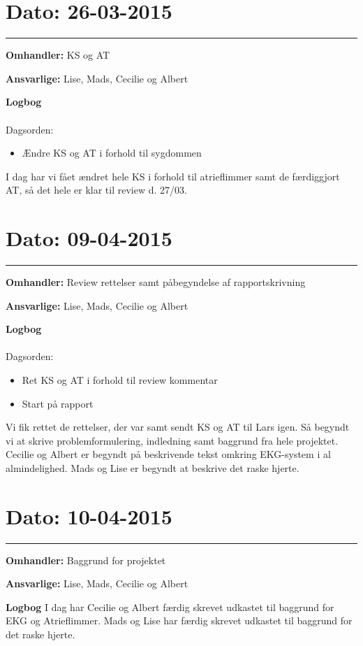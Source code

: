 \section{Dato: 26-03-2015}
\hrule 

\textbf{Omhandler:} KS og AT 

\textbf{Ansvarlige:} Lise, Mads, Cecilie og Albert
 
\textbf{Logbog}
\\
\\
Dagsorden:
\begin{itemize}
	\item Ændre KS og AT i forhold til sygdommen
\end{itemize}

I dag har vi fået ændret hele KS i forhold til atrieflimmer samt de færdiggjort AT, så det hele er klar til review d. 27/03. 



\section{Dato: 09-04-2015}
\hrule 

\textbf{Omhandler:} Review rettelser samt påbegyndelse af rapportskrivning 

\textbf{Ansvarlige:} Lise, Mads, Cecilie og Albert 

\textbf{Logbog}
\\
\\
Dagsorden:
\begin{itemize}
	\item Ret KS og AT i forhold til review kommentar 
	\item Start på rapport 
\end{itemize}

Vi fik rettet de rettelser, der var samt sendt KS og AT til Lars igen. 
Så begyndt vi at skrive problemformulering, indledning samt baggrund fra hele projektet. Cecilie og Albert er begyndt på beskrivende tekst omkring EKG-system i al almindelighed. Mads og Lise er begyndt at beskrive det raske hjerte. 

\section{Dato: 10-04-2015}
\hrule 


\textbf{Omhandler:} Baggrund for projektet

\textbf{Ansvarlige:} Lise, Mads, Cecilie og Albert 

\textbf{Logbog}
I dag har Cecilie og Albert færdig skrevet udkastet til baggrund for EKG og Atrieflimmer. 
Mads og Lise har færdig skrevet udkastet til baggrund for det raske hjerte. 


